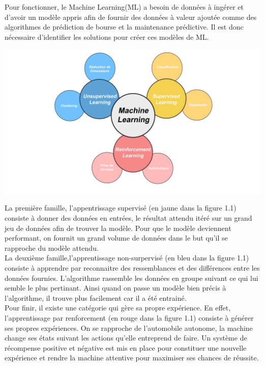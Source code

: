 \documentclass[12pt,a4paper]{report}
\begin{document}
Pour fonctionner, le Machine Learning(ML) a besoin de données à ingérer et d'avoir un modèle appris afin de fournir des données à valeur ajoutée comme des algorithmes de prédiction de bourse et la maintenance prédictive. Il est donc nécessaire d'identifier les solutions pour créer ces modèles de ML.\\

\begin{center}
	\includegraphics[scale=0.2]{ML_vignette}
	\label{fig1}
\end{center}

La première famille, l'appentrissage supervisé (en jaune dans la figure 1.1) consiste à donner des données en entrées, le résultat attendu itéré sur un grand jeu de données afin de trouver la modèle. Pour que le modèle deviennent performant, on fournit un grand volume de données dans le but qu'il se rapproche du modèle attendu.\\

La deuxième famille,l'apprentissage non-surpervisé (en bleu dans la figure 1.1) consiste à apprendre par reconnaitre des ressemblances et des différences entre les données fournies. L'algorithme rassemble les données en groupe suivant ce qui lui semble le plus pertinant. Ainsi quand on passe un modèle bien précis à l'algorithme, il trouve plus facilement car il a été entrainé.\\

Pour finir, il existe une catégorie qui gère sa propre expérience. En effet, l'apprentissage par renforcement (en rouge dans la figure 1.1) consiste à générer ses propres expériences. On se rapproche de l'automobile autonome, la machine change ses états suivant les actions qu'elle entreprend de faire. Un système de récompense positive et négative est mis en place pour constituer une nouvelle expérience et rendre la machine attentive pour maximiser ses chances de réussite.\\
\pagebreak
\end{document}
